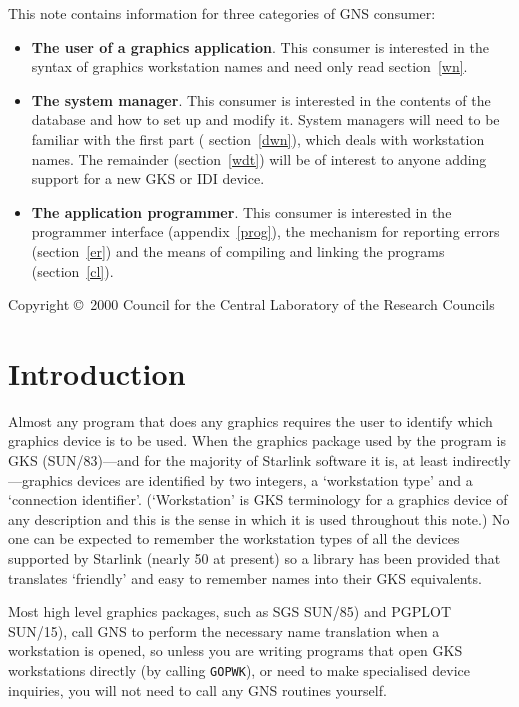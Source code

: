 \documentclass[twoside,11pt]{article}
\newcommand{\stardocinitials}  {SUN}
\newcommand{\stardoccopyright} 
{Copyright \copyright\ 2000 Council for the Central Laboratory of the Research Councils}
\newcommand{\stardocnumber}    {57.9}
\newcommand{\stardocabstract}  {
This note contains information for three categories of GNS consumer:

\begin{itemize}

\item {\bf The user of a graphics application}. This consumer is interested in
the syntax of graphics workstation names and need only read
\hyperref{this section}{section~}{}{wn}.

\item {\bf The system manager}. This consumer is interested in the contents
of the database and how to set up and modify it. System managers will need to
be familiar with the first part (
\hyperref{this section}{section~}{}{dwn}), which deals with
workstation names. The remainder
(\hyperref{this section}{section~}{}{wdt}) will be of interest to
anyone adding support for a new GKS or IDI device.

\item {\bf The application programmer}. This consumer is interested in the
programmer interface
(\hyperref{this appendix}{appendix~}{}{prog}), the mechanism for reporting
errors
(\hyperref{this section}{section~}{}{er}) and the means of compiling and linking the
programs (\hyperref{this section}{section~}{}{cl}).

\end{itemize}
}
\newcommand{\stardocname}{\stardocinitials /\stardocnumber}
\newcommand{\hyperref}[4]{#2\ref{#4}#3}
\newenvironment{latexonly}{}{}
\newcommand{\xref}[3]{#1}
\renewcommand{\_}{\texttt{\symbol{95}}}
\renewcommand{\thepage}{\roman{page}}
\begin{document}
\stardocabstract

\begin{latexonly}
\newpage
\vspace*{\fill}
\stardoccopyright
\end{latexonly}

  \newpage
  \begin{latexonly}
    \setlength{\parskip}{0mm}
    \tableofcontents
    \setlength{\parskip}{\medskipamount}
    \markboth{\stardocname}{\stardocname}
  \end{latexonly}

\cleardoublepage
\renewcommand{\thepage}{\arabic{page}}
\setcounter{page}{1}

\section{Introduction}\label{in}

Almost any program that does any graphics requires the user to identify which
graphics device is to be used. When the graphics package used by the program is
GKS (\xref{SUN/83}{sun83}{})---and for the majority of Starlink
software it is, at least indirectly---graphics devices are
identified by two integers, a `workstation type' and a `connection
identifier'. (`Workstation' is GKS terminology for a graphics device of any
description and this is the sense in which it is used throughout this
note.) No one can be expected to remember the workstation types of all the
devices supported by Starlink (nearly 50 at present) so a library has been
provided that translates `friendly' and easy to remember names into their GKS
equivalents.

Most high level graphics packages, such as SGS \xref{SUN/85}{sun85}{})
and PGPLOT \xref{SUN/15}{sun15}{}), call GNS to
perform the necessary name translation when a workstation is opened, so
unless you are writing programs that open GKS workstations directly
(by calling {\tt GOPWK}), or need to make specialised device inquiries,
you will not need to call any GNS routines yourself.
\end{document}
